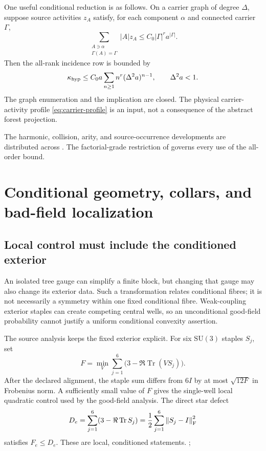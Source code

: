 \documentclass[11pt,oneside,openany]{book}
\theoremstyle{definition}
\theoremstyle{remark}
\newcommand{\Tr}{\operatorname{Tr}}
\newcommand{\SU}{\mathrm{SU}}
\newcommand{\norm}[1]{\left\lVert#1\right\rVert}
\newcommand{\src}[2]{\cite[#2]{#1}}
\newcommand{\sourcebasis}[1]{\par\smallskip\noindent #1\par}
\begin{document}
One useful conditional reduction is as follows. On a carrier graph of degree $\Delta$, suppose source activities $z_A$ satisfy, for each component $\alpha$ and connected carrier $\Gamma$,
\begin{equation}\label{eq:carrier-profile}
\sum_{\substack{A\ni\alpha\\\Gamma(A)=\Gamma}}|A|z_A
\le C_0|\Gamma|^r a^{|\Gamma|}.
\end{equation}
Then the all-rank incidence row is bounded by
\begin{equation}\label{eq:carrier-row}
\kappa_{\rm hyp}\le C_0a\sum_{n\ge1}n^r(\Delta^2a)^{n-1},
\qquad \Delta^2a<1.
\end{equation}
The graph enumeration and the implication are closed. The physical carrier-activity profile \cref{eq:carrier-profile} is an input, not a consequence of the abstract forest projection. \src{F6}{V16}
\sourcebasis{The harmonic, collision, arity, and source-occurrence developments are distributed across \cite{F1,F2,F3,F4,F5,F6}. The factorial-grade restriction of \src{F5}{V12} governs every use of the all-order bound.}

\chapter{Conditional geometry, collars, and bad-field localization}
\label{ch:geometry}
\section{Local control must include the conditioned exterior}
An isolated tree gauge can simplify a finite block, but changing that gauge may also change its exterior data. Such a transformation relates conditional fibres; it is not necessarily a symmetry within one fixed conditional fibre. Weak-coupling exterior staples can create competing central wells, so an unconditional good-field probability cannot justify a uniform conditional convexity assertion.

The source analysis keeps the fixed exterior explicit. For six $\SU(3)$ staples $S_j$, set
\[
F=\min_V\sum_{j=1}^{6}\bigl(3-\Re\Tr(VS_j)\bigr).
\]
After the declared alignment, the staple sum differs from $6I$ by at most $\sqrt{12F}$ in Frobenius norm. A sufficiently small value of $F$ gives the single-well local quadratic control used by the good-field analysis. The direct star defect
\[
D_e=\sum_{j=1}^{6}(3-\Re\Tr S_j)
=\frac12\sum_{j=1}^{6}\norm{S_j-I}_{\rm F}^2
\]
satisfies $F_e\le D_e$. These are local, conditioned statements. \src{F6}{terminal staple analysis}; \src{F7}{opening geometric audit}
\end{document}
